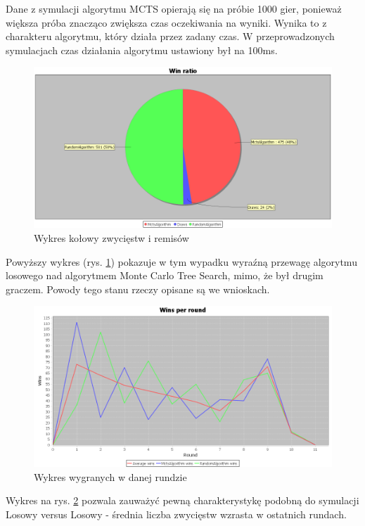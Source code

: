 Dane z symulacji algorytmu MCTS opierają się na próbie 1000 gier, ponieważ większa próba znacząco zwiększa czas oczekiwania na wyniki. Wynika to z charakteru algorytmu, który działa przez zadany czas. W przeprowadzonych symulacjach czas działania algorytmu ustawiony był na 100ms.

\begin{figure}[H]
	\centering
	\includegraphics[width=\textwidth]{Resources/MctsVsR/MctsVsRwin.PNG}
	\caption{Wykres kołowy zwycięstw i remisów} 
	\label{fig:MctsVsRwin}
\end{figure}

Powyższy wykres (rys. \ref{fig:MctsVsRwin}) pokazuje w tym wypadku wyraźną przewagę algorytmu losowego nad algorytmem Monte Carlo Tree Search, mimo, że był drugim graczem. Powody tego stanu rzeczy opisane są we wnioskach.

\begin{figure}[H]
	\centering
	\includegraphics[width=\textwidth]{Resources/MctsVsR/MctsVsRroundwin.PNG}
	\caption{Wykres wygranych w danej rundzie} 
	\label{fig:MctsVsRroundwin}
\end{figure}

Wykres na rys. \ref{fig:MctsVsRroundwin} pozwala zauważyć pewną charakterystykę podobną do symulacji Losowy versus Losowy - średnia liczba zwycięstw wzrasta w ostatnich rundach.

